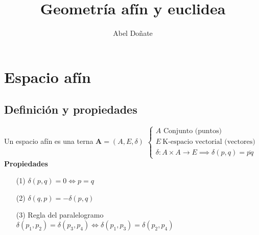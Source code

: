 \documentclass{article}
\title{Geometría afín y euclidea}
\author{Abel Doñate}
\begin{document}
\maketitle
\tableofcontents
\newpage

\section{Espacio afín}
\subsection{Definición y propiedades}
Un espacio afín es una terna $\mathbf{A} = (A, E, \delta)$ 
$
\begin{cases}
    A \text{ Conjunto (puntos)} \\
    E \ \text{K-espacio vectorial (vectores)} \\
    \delta:A\times A \to E \implies \delta(p,q) = \overline{pq}
\end{cases}$
\\
\textbf{Propiedades}
\begin{itemize}
    \item[(1)] $\delta(p,q) = 0 \iff p=q$
    \item[(2)] $\delta(q,p) = -\delta(p,q)$
    \item[(3)] Regla del paralelogramo $\delta(p_1, p_2)=\delta(p_3, p_4) \iff \delta(p_1, p_3)=\delta(p_2, p_4)$
\end{itemize}
\end{document}
